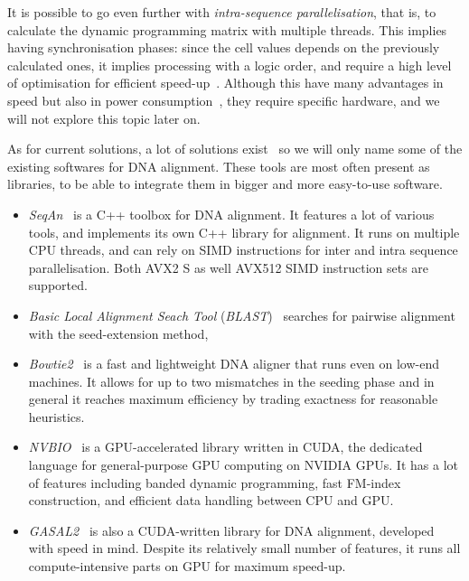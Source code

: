 It is possible to go even further with \emph{intra-sequence parallelisation}, that is, to calculate the dynamic programming matrix with multiple threads. This implies having synchronisation phases: since the cell values depends on the previously calculated ones, it implies processing with a logic order, and require a high level of optimisation for efficient speed-up~\cite{Houtgast:gpu-accelerated}. Although this have many advantages in speed but also in power consumption~\cite{Houtgast:power-efficiency}, they require specific hardware, and we will not explore this topic later on.

As for current solutions, a lot of solutions exist~\cite{wiki:ListAlignmentSoft} so we will only name some of the existing softwares for DNA alignment. These tools are most often present as libraries, to be able to integrate them in bigger and more easy-to-use software.

\begin{itemize}
    \item \emph{SeqAn}~\cite{Doring:seqan} is a C++ toolbox for DNA alignment. It features a lot of various tools, and implements its own C++ library for alignment. It runs on multiple CPU threads, and can rely on SIMD instructions for inter and intra sequence parallelisation. Both AVX2 S as well AVX512 SIMD instruction sets are supported.
    \item \emph{Basic Local Alignment Seach Tool} (\emph{BLAST})~\cite{Altschul:BLAST} searches for pairwise alignment with the seed-extension method,
    \item \emph{Bowtie2}~\cite{Langmead:bowtie} is a fast and lightweight DNA aligner that runs even on low-end machines. It allows for up to two mismatches in the seeding phase and in general it reaches maximum efficiency by trading exactness for reasonable heuristics.
    \item \emph{NVBIO}~\cite{nvidia:nvbio} is a GPU-accelerated library written in CUDA, the dedicated language for general-purpose GPU computing on NVIDIA GPUs. It has a lot of features including banded dynamic programming, fast FM-index construction, and efficient data handling between CPU and GPU.
    \item \emph{GASAL2}~\cite{Ahmed:gasal2} is also a CUDA-written library for DNA alignment, developed with speed in mind. Despite its relatively small number of features, it runs all compute-intensive parts on GPU for maximum speed-up.
\end{itemize}


